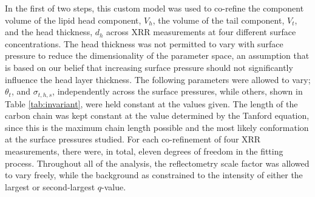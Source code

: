 \documentclass[twoside,twocolumn,9pt]{article}
\begin{document}
In the first of two steps, this custom model was used to co-refine the component volume of the lipid head component, $V_h$, the volume of the tail component, $V_t$, and the head thickness, $d_h$ across XRR measurements at four different surface concentrations. The head thickness was not permitted to vary with surface pressure to reduce the dimensionality of the parameter space, an assumption that is based on our belief that increasing surface pressure should not significantly influence the head layer thickness. The following parameters were allowed to vary; $\theta_t$, and $\sigma_{t,h,s}$, independently across the surface pressures, while others, shown in Table \ref{tab:invariant}, were held constant at the values given. The length of the carbon chain was kept constant at the value determined by the Tanford equation,\cite{Tanford1980} since this is the maximum chain length possible and the most likely conformation at the surface pressures studied. For each co-refinement of four XRR measurements, there were, in total, eleven degrees of freedom in the fitting process. Throughout all of the analysis, the reflectometry scale factor was allowed to vary freely, while the background as constrained to the intensity of either the largest or second-largest $q$-value. 
\end{document}
